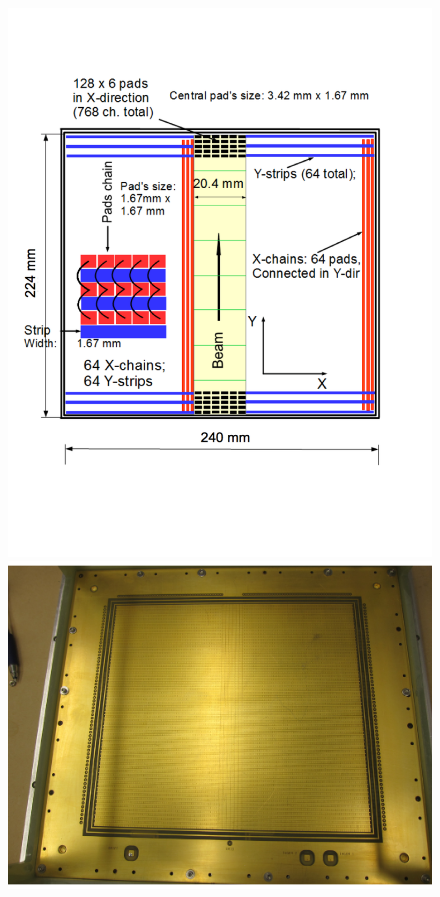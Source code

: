 \documentclass[final,number,sort&compress,5p,times,twocolumn]{elsarticle}
\begin{document}
\begin{figure}[hbt!]
    \centering
     \includegraphics[width=1.0\columnwidth]{Figs/MMBoardLayout}
    \includegraphics[width=1.0\columnwidth]{Figs/MMBoard}

\end{figure}
\end{document}
